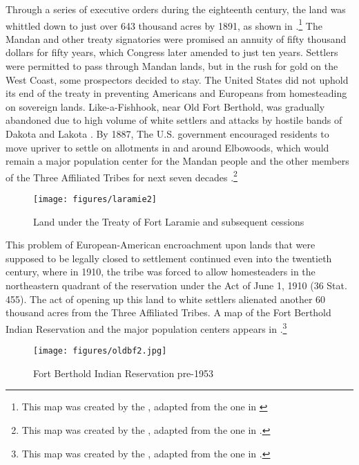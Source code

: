 Through a series of executive orders during the eighteenth century, the land was whittled down to just over 643 thousand acres by 1891, as shown in .\footnote{This map was created by the \citet{northdakota}, adapted from the one in \citet[193]{meyer1977}} The Mandan and other treaty signatories were promised an annuity of fifty thousand dollars for fifty years, which Congress later amended to just ten years. Settlers were permitted to pass through Mandan lands, but in the rush for gold on the West Coast, some prospectors decided to stay. The United States did not uphold its end of the treaty in preventing Americans and Europeans from homesteading on sovereign lands. Like-a-Fishhook, near Old Fort Berthold, was gradually abandoned due to high volume of white settlers and attacks by hostile bands of Dakota and Lakota \citep[119]{meyer1977}. By 1887, The U.S. government encouraged residents to move upriver to settle on allotments in and around Elbowoods, which would remain a major population center for the Mandan people and the other members of the Three Affiliated Tribes for next seven decades \citep[1]{densmore1923}.\footnote{This map was created by the \citet{northdakota}, adapted from the one in \citet[112]{meyer1977}.}


\begin{figure}[t]
\caption{Land under the Treaty of Fort Laramie and subsequent cessions}
\label{laramie}
\texttt{[image: figures/laramie2]}
\end{figure}

This problem of European-American encroachment upon lands that were supposed to be legally closed to settlement continued even into the twentieth century, where in 1910, the tribe was forced to allow homesteaders in the northeastern quadrant of the reservation under the Act of June 1, 1910 (36 Stat. 455). The act of opening up this land to white settlers alienated another 60 thousand acres from the Three Affiliated Tribes. A map of the Fort Berthold Indian Reservation and the major population centers appears in .\footnote{This map was created by the \citet{northdakota}, adapted from the one in \citet[193]{meyer1977}.}

\begin{figure}
\caption{Fort Berthold Indian Reservation pre-1953}
\label{oldfb}
\texttt{[image: figures/oldbf2.jpg]}
\end{figure}

